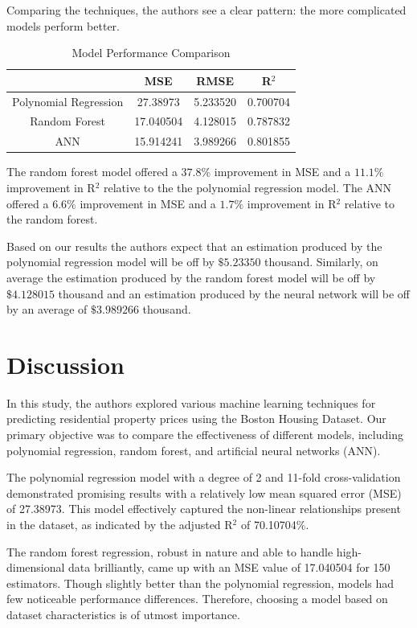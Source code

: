 \documentclass[conference, 11pt]{IEEEtran}
\begin{document}
Comparing the techniques, the authors see a clear pattern: the more complicated models perform better.

\begin{table}[h!]
\caption{Model Performance Comparison}
\centering
\begin{tabular}{| c | c | c | c |}
  \hline
  & MSE & RMSE & R$^2$ \\
  \hline
  Polynomial Regression & 27.38973  & 5.233520 & 0.700704 \\
  \hline
  Random Forest & 17.040504 & 4.128015 & 0.787832 \\
  \hline
  ANN & 15.914241 & 3.989266 & 0.801855 \\
  \hline
\end{tabular}
\label{table:comparison}
\end{table}

The random forest model offered a $37.8\%$ improvement in MSE  and a $11.1\%$ improvement in R$^2$ relative to the the polynomial regression model. The ANN offered a $6.6\%$ improvement in MSE and a $1.7\%$ improvement in R$^2$ relative to the random forest.

Based on our results the authors expect that an estimation produced by the polynomial regression model will be off by $\$5.23350$ thousand. Similarly, on average the estimation produced by the random forest model will be off by $\$4.128015$ thousand and an estimation produced by the neural network will be off by an average of $\$3.989266$ thousand.

\section{Discussion}
In this study, the authors explored various machine learning techniques for predicting residential property prices using the Boston Housing Dataset. Our primary objective was to compare the effectiveness of different models, including polynomial regression, random forest, and artificial neural networks (ANN).

The polynomial regression model with a degree of 2 and 11-fold cross-validation demonstrated promising results with a relatively low mean squared error (MSE) of 27.38973. This model effectively captured the non-linear relationships present in the dataset, as indicated by the adjusted R$^2$ of 70.10704\%.

The random forest regression, robust in nature and able to handle high-dimensional data brilliantly, came up with an MSE value of 17.040504 for 150 estimators. Though slightly better than the polynomial regression, models had few noticeable performance differences. Therefore, choosing a model based on dataset characteristics is of utmost importance.
\end{document}
